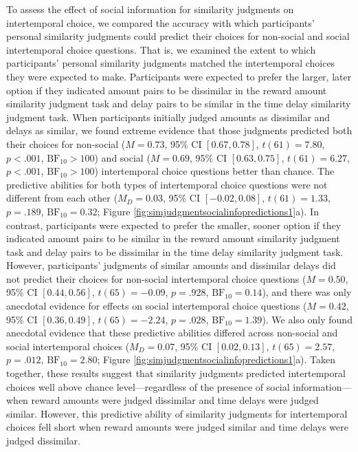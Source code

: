 \documentclass[
  pub,floatsintext]{apa6}
\begin{document}
To assess the effect of social information for similarity judgments on intertemporal choice, we compared the accuracy with which participants' personal similarity judgments could predict their choices for non-social and social intertemporal choice questions. That is, we examined the extent to which participants' personal similarity judgments matched the intertemporal choices they were expected to make. Participants were expected to prefer the larger, later option if they indicated amount pairs to be dissimilar in the reward amount similarity judgment task and delay pairs to be similar in the time delay similarity judgment task. When participants initially judged amounts as dissimilar and delays as similar, we found extreme evidence that those judgments predicted both their choices for non-social (\(M = 0.73\), 95\% CI \([0.67, 0.78]\), \(t(61) = 7.80\), \(p < .001\), \(\mathrm{BF}_{\textrm{10}} > 100\)) and social (\(M = 0.69\), 95\% CI \([0.63, 0.75]\), \(t(61) = 6.27\), \(p < .001\), \(\mathrm{BF}_{\textrm{10}} > 100\)) intertemporal choice questions better than chance. The predictive abilities for both types of intertemporal choice questions were not different from each other (\(M_D = 0.03\), 95\% CI \([-0.02, 0.08]\), \(t(61) = 1.33\), \(p = .189\), \(\mathrm{BF}_{\textrm{10}} = 0.32\); Figure \ref{fig:simjudgmentsocialinfopredictions1}a). In contrast, participants were expected to prefer the smaller, sooner option if they indicated amount pairs to be similar in the reward amount similarity judgment task and delay pairs to be dissimilar in the time delay similarity judgment task. However, participants' judgments of similar amounts and dissimilar delays did not predict their choices for non-social intertemporal choice questions (\(M = 0.50\), 95\% CI \([0.44, 0.56]\), \(t(65) = -0.09\), \(p = .928\), \(\mathrm{BF}_{\textrm{10}} = 0.14\)), and there was only anecdotal evidence for effects on social intertemporal choice questions (\(M = 0.42\), 95\% CI \([0.36, 0.49]\), \(t(65) = -2.24\), \(p = .028\), \(\mathrm{BF}_{\textrm{10}} = 1.39\)). We also only found anecdotal evidence that these predictive abilities differed across non-social and social intertemporal choices (\(M_D = 0.07\), 95\% CI \([0.02, 0.13]\), \(t(65) = 2.57\), \(p = .012\), \(\mathrm{BF}_{\textrm{10}} = 2.80\); Figure \ref{fig:simjudgmentsocialinfopredictions1}a). Taken together, these results suggest that similarity judgments predicted intertemporal choices well above chance level---regardless of the presence of social information---when reward amounts were judged dissimilar and time delays were judged similar. However, this predictive ability of similarity judgments for intertemporal choices fell short when reward amounts were judged similar and time delays were judged dissimilar.
\end{document}
